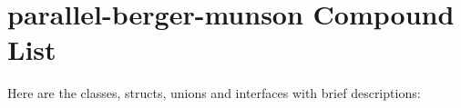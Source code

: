 \section{parallel-berger-munson Compound List}
Here are the classes, structs, unions and interfaces with brief descriptions:\begin{CompactList}
\item{}
\end{CompactList}
